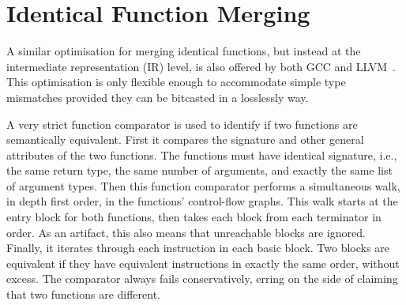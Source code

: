 
\section{Identical Function Merging}

A similar optimisation for merging identical functions, but instead at the
intermediate representation (IR) level, is also offered by both GCC and
LLVM~\cite{llvm-fm,livska14}.
This optimisation is only flexible enough to accommodate simple type mismatches
provided they can be bitcasted in a losslessly way.


A very strict function comparator is used to identify if two functions are 
semantically equivalent.
First it compares the signature and other general attributes of the two functions.
The functions must have identical signature, i.e., the same return type, the same
number of arguments, and exactly the same list of argument types.
Then this function comparator performs a simultaneous walk, in depth
first order, in the functions' control-flow graphs.
This walk starts at the entry block for both functions, then takes each block
from each terminator in order.
As an artifact, this also means that unreachable blocks are ignored.
Finally, it iterates through each instruction in each basic block.
Two blocks are equivalent if they have equivalent instructions in exactly the
same order, without excess.
The comparator always fails conservatively, erring on the side of claiming that
two functions are different.


